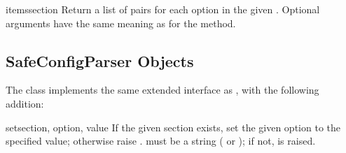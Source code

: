 \begin{methoddesc}{items}{section}
Return a list of  pairs for each
option in the given . Optional arguments have the
same meaning as for the  method.
\end{methoddesc}


\subsection{SafeConfigParser Objects \label{SafeConfigParser-objects}}

The  class implements the same extended
interface as , with the following addition:

\begin{methoddesc}{set}{section, option, value}
If the given section exists, set the given option to the specified
value; otherwise raise .   must
be a string ( or ); if not,
 is raised.
\end{methoddesc}
